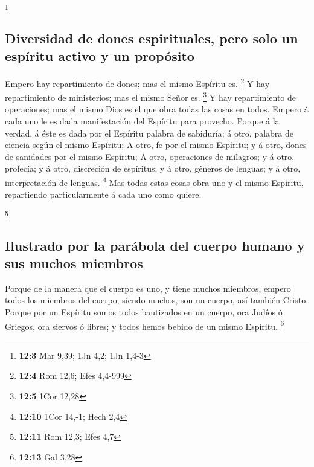 \footnote{\textbf{12:3} Mar 9,39; 1Jn 4,2; 1Jn 1,4-3}

\hypertarget{diversidad-de-dones-espirituales-pero-solo-un-espuxedritu-activo-y-un-propuxf3sito}{%
\subsection{Diversidad de dones espirituales, pero solo un espíritu
activo y un
propósito}\label{diversidad-de-dones-espirituales-pero-solo-un-espuxedritu-activo-y-un-propuxf3sito}}

 Empero hay repartimiento de dones; mas el mismo Espíritu
es. \footnote{\textbf{12:4} Rom 12,6; Efes 4,4-999}  Y hay
repartimiento de ministerios; mas el mismo Señor es. \footnote{\textbf{12:5}
  1Cor 12,28}  Y hay repartimiento de operaciones; mas el
mismo Dios es el que obra todas las cosas en todos. 
Empero á cada uno le es dada manifestación del Espíritu para provecho.
 Porque á la verdad, á éste es dada por el Espíritu
palabra de sabiduría; á otro, palabra de ciencia según el mismo
Espíritu;  A otro, fe por el mismo Espíritu; y á otro,
dones de sanidades por el mismo Espíritu;  A otro,
operaciones de milagros; y á otro, profecía; y á otro, discreción de
espíritus; y á otro, géneros de lenguas; y á otro, interpretación de
lenguas. \footnote{\textbf{12:10} 1Cor 14,-1; Hech 2,4} 
Mas todas estas cosas obra uno y el mismo Espíritu, repartiendo
particularmente á cada uno como quiere.

\footnote{\textbf{12:11} Rom 12,3; Efes 4,7}

\hypertarget{ilustrado-por-la-paruxe1bola-del-cuerpo-humano-y-sus-muchos-miembros}{%
\subsection{Ilustrado por la parábola del cuerpo humano y sus muchos
miembros}\label{ilustrado-por-la-paruxe1bola-del-cuerpo-humano-y-sus-muchos-miembros}}

 Porque de la manera que el cuerpo es uno, y tiene muchos
miembros, empero todos los miembros del cuerpo, siendo muchos, son un
cuerpo, así también Cristo.  Porque por un Espíritu somos
todos bautizados en un cuerpo, ora Judíos ó Griegos, ora siervos ó
libres; y todos hemos bebido de un mismo Espíritu. \footnote{\textbf{12:13}
  Gal 3,28}

